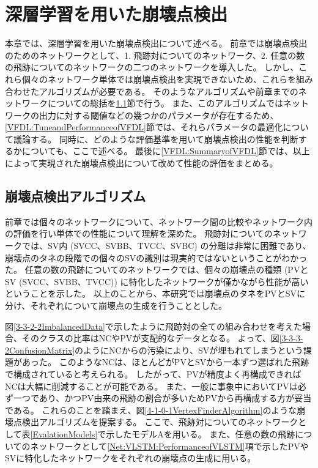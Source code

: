 
\chapter{深層学習を用いた崩壊点検出} \label{chap:VertexFinderwithDL}

本章では、深層学習を用いた崩壊点検出について述べる。
前章では崩壊点検出のためのネットワークとして、1. 飛跡対についてのネットワーク、2. 任意の数の飛跡についてのネットワークの二つのネットワークを導入した。
しかし、これら個々のネットワーク単体では崩壊点検出を実現できないため、これらを組み合わせたアルゴリズムが必要である。
そのようなアルゴリズムや前章までのネットワークについての総括を\ref{VFDL:AlgorithmofVFDL}節で行う。
また、このアルゴリズムではネットワークの出力に対する閾値などの幾つかのパラメータが存在するため、\ref{VFDL:TuneandPerformanceofVFDL}節では、それらパラメータの最適化について議論する。
同時に、どのような評価基準を用いて崩壊点検出の性能を判断するかについても、ここで述べる。
最後に\ref{VFDL:SummaryofVFDL}節では、以上によって実現された崩壊点検出について改めて性能の評価をまとめる。


\section{崩壊点検出アルゴリズム} \label{VFDL:AlgorithmofVFDL}

前章では個々のネットワークについて、ネットワーク間の比較やネットワーク内の評価を行い単体での性能について理解を深めた。
飛跡対についてのネットワークでは、SV内 (SVCC、SVBB、TVCC、SVBC) の分離は非常に困難であり、崩壊点のタネの段階での個々のSVの識別は現実的ではないということがわかった。
任意の数の飛跡についてのネットワークでは、個々の崩壊点の種類 (PVとSV (SVCC、SVBB、TVCC)) に特化したネットワークが僅かながら性能が高いということを示した。
以上のことから、本研究では崩壊点のタネをPVとSVに分け、それぞれについて崩壊点の生成を行うこととした。

図\ref{3-3-2-2ImbalancedData}で示したように飛跡対の全ての組み合わせを考えた場合、そのクラスの比率はNCやPVが支配的なデータとなる。
よって、図\ref{3-3-3-2ConfusionMatrix}のようにNCからの汚染により、SVが埋もれてしまうという課題があった。
このようなNCは、ほとんどがPVとSVから一本ずつ選ばれた飛跡で構成されていると考えられる。
したがって、PVが精度よく再構成できればNCは大幅に削減することが可能である。
また、一般に事象中においてPVは必ず一つであり、かつPV由来の飛跡の割合が多いためPVから再構成する方が妥当である。
これらのことを踏まえ、図\ref{4-1-0-1VertexFinderAlgorithm}のような崩壊点検出アルゴリズムを提案する。
ここで、飛跡対についてのネットワークとして表\ref{EvalationModels}で示したモデルAを用いる。
また、任意の数の飛跡についてのネットワークとして\ref{Net:VLSTM:PerformanceofVLSTM}項で示したPVやSVに特化したネットワークをそれぞれの崩壊点の生成に用いる。

